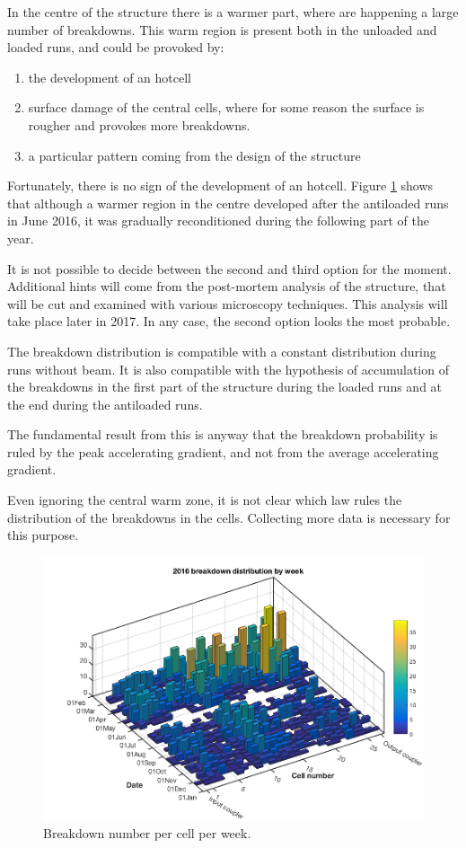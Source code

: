 In the centre of the structure there is a warmer part, where are happening a large number of breakdowns. This warm region is present both in the unloaded and loaded runs, and could be provoked by: 
\begin{enumerate}
\item the development of an hotcell
\item surface damage of the central cells, where for some reason the surface is rougher and provokes more breakdowns. 
\item a particular pattern coming from the design of the structure
\end{enumerate}
Fortunately, there is no sign of the development of an hotcell. Figure \ref{BD_3d} shows that although a warmer region in the centre developed after the antiloaded runs in June 2016, it was gradually reconditioned during the following part of the year. 

It is not possible to decide between the second and third option for the moment. Additional hints will come from the post-mortem analysis of the structure, that will be cut and examined with various microscopy techniques. This analysis will take place later in 2017. In any case, the second option looks the most probable. 

The breakdown distribution is compatible with a constant distribution during runs without beam. It is also compatible with the hypothesis of accumulation of the breakdowns in  the first part of the structure during the loaded runs and at the end during the antiloaded runs.

The fundamental result from this is anyway that the breakdown probability is ruled by the peak accelerating gradient, and not from the average accelerating gradient.


Even ignoring the central warm zone, it is not clear which law rules the distribution of the breakdowns in the cells. Collecting more data is necessary for this purpose.

\begin{figure}[h]
\centering 
\includegraphics[scale=0.4]{pictures/week_distr_3D.png}
\caption{Breakdown number per cell per week. }
\label{BD_3d}
\end{figure}



